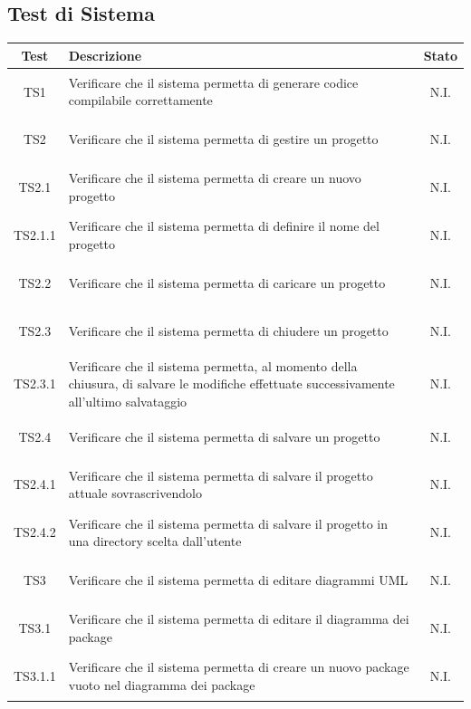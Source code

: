 \documentclass[../PianoDiQualifica.tex]{subfiles}
\begin{document}
\newpage
\subsection{Test di Sistema}
\normalsize
\begin{longtable}{|c|>{\centering}p{10cm}|c|}
	\hline
	\textbf{Test} & \textbf{Descrizione} & \textbf{Stato}\\
	\hline
	\endhead
	
	\hypertarget{TS1}{TS1} & Verificare che il sistema permetta di generare codice compilabile correttamente & N.I. \\
	\hline
	\hypertarget{TS2}{TS2} & Verificare che il sistema permetta di gestire un progetto & N.I. \\
	\hline
	\hypertarget{TS2.1}{TS2.1} & Verificare che il sistema permetta di creare un nuovo progetto & N.I. \\
	\hline
	\hypertarget{TS2.1.1}{TS2.1.1} & Verificare che il sistema permetta di definire il nome del progetto & N.I. \\
	\hline
	\hypertarget{TS2.2}{TS2.2} & Verificare che il sistema permetta di caricare un progetto & N.I. \\
	\hline
	\hypertarget{TS2.3}{TS2.3} & Verificare che il sistema permetta di chiudere un progetto & N.I. \\
	\hline
	\hypertarget{TS2.3.1}{TS2.3.1} & Verificare che il sistema permetta, al momento della chiusura, di salvare le modifiche effettuate successivamente all'ultimo salvataggio & N.I. \\
	\hline
	\hypertarget{TS2.4}{TS2.4} & Verificare che il sistema permetta di salvare un progetto & N.I. \\
	\hline
	\hypertarget{TS2.4.1}{TS2.4.1} & Verificare che il sistema permetta di salvare il progetto attuale sovrascrivendolo & N.I. \\
	\hline
	\hypertarget{TS2.4.2}{TS2.4.2} & Verificare che il sistema permetta di salvare il progetto in una directory scelta dall'utente & N.I. \\
	\hline
	\hypertarget{TS3}{TS3} & Verificare che il sistema permetta di editare diagrammi UML & N.I. \\
	\hline
	\hypertarget{TS3.1}{TS3.1} & Verificare che il sistema permetta di editare il diagramma dei package & N.I. \\
	\hline
	\hypertarget{TS3.1.1}{TS3.1.1} & Verificare che il sistema permetta di creare un nuovo package vuoto nel diagramma dei package & N.I. \\

\end{longtable}
\end{document}
